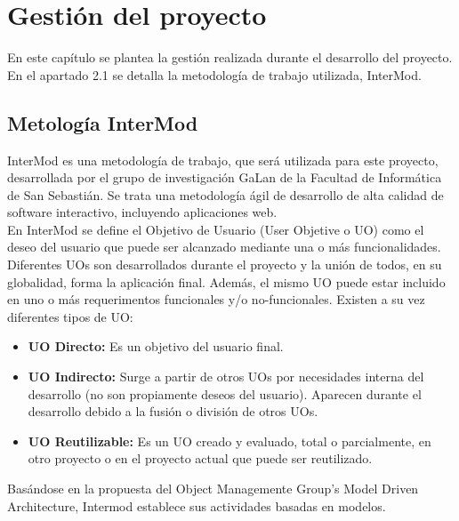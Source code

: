 
\chapter{Gestión del proyecto}
\label{gestion}

En este capítulo se plantea la gestión realizada durante el desarrollo del proyecto. En el apartado 2.1 se detalla la metodología de trabajo utilizada, InterMod.\\

\section{Metología InterMod}
\label{intermod}

InterMod es una metodología de trabajo, que será utilizada para este proyecto, desarrollada por el grupo de investigación GaLan de la Facultad de Informática de San Sebastián. Se trata una metodología ágil de desarrollo de alta calidad de software interactivo, incluyendo aplicaciones web.\\

En InterMod se define el Objetivo de Usuario (User Objetive o UO) como el deseo del usuario que puede ser alcanzado mediante una o más funcionalidades. Diferentes UOs son desarrollados durante el proyecto y la unión de todos, en su globalidad, forma la aplicación final. Además, el mismo UO puede estar incluido en uno o más requerimentos funcionales y/o no-funcionales. Existen a su vez diferentes tipos de UO:

\begin{itemize}
\item \textbf{UO Directo:} Es un objetivo del usuario final.
\item \textbf{UO Indirecto:} Surge a partir de otros UOs por necesidades interna del desarrollo (no son propiamente deseos del usuario). Aparecen durante el desarrollo debido a la fusión o división de otros UOs.
\item \textbf{UO Reutilizable:} Es un UO creado y evaluado, total o parcialmente, en otro proyecto o en el proyecto actual que puede ser reutilizado.
\end{itemize}

Basándose en la propuesta del Object Managemente Group’s Model Driven Architecture, Intermod establece sus actividades basadas en modelos.\\

